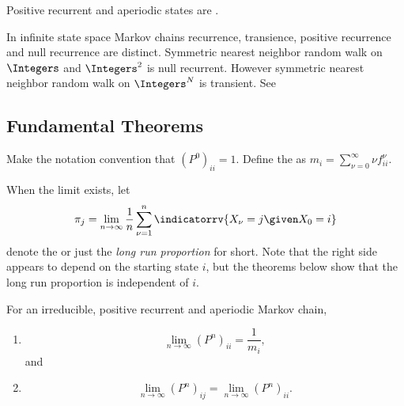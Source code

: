 \documentclass[12pt]{article}
\begin{document}
\begin{definition}
    Positive recurrent and aperiodic states are .
\end{definition}

\begin{example}
    In infinite state space Markov chains recurrence, transience,
    positive recurrence and null recurrence are distinct.  Symmetric
    nearest neighbor random walk on \( \Integers \) and \( \Integers^2 \)
    is null recurrent.  However symmetric nearest neighbor random walk
    on \( \Integers^N \) is transient.  See
    \cite[Chapter 13]{lesigne05}
\end{example}
\subsection*{Fundamental Theorems}

\begin{remark}
    Make the notation convention that \( (P^{0})_{ii} = 1 \).  Define
    the  as \( m_i = \sum_ {\nu=0}^ {\infty}
    \nu f^\nu_{ii} \).
\end{remark}

\begin{definition}
    When the limit exists, let
    \[
        \pi_j = \lim_{n \to \infty} \frac{1}{n} \sum\limits_{\nu=1}^n
        \indicatorrv{X_{\nu}= j \given X_0 = i}
    \] denote the  or just the \emph{long run proportion} for short.
    Note that the right side appears to depend on the starting state \(
    i \), but the theorems below show that the long run proportion is
    independent of \( i \).
\end{definition}

\begin{theorem}
    For an irreducible, positive recurrent and aperiodic Markov chain,
    \begin{enumerate}
        \item
            \[
                \lim_{n \to \infty} (P^{n})_{ii} = \frac{1}{m_i},
            \] and
        \item
            \[
                \lim_{n \to \infty} (P^{n})_{ij} = \lim_{n \to \infty} (P^
                {n})_{ii}.
            \]
    \end{enumerate}
\end{theorem}
\end{document}
